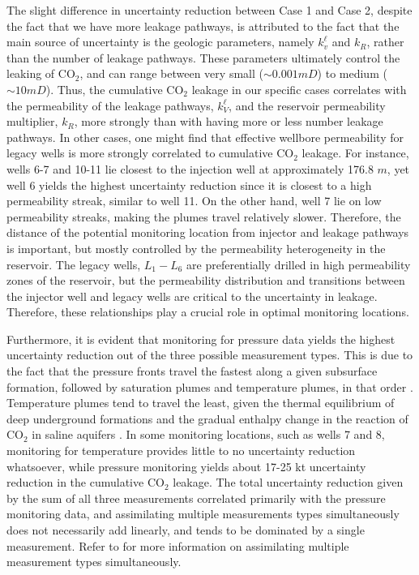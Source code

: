 \documentclass[a4paper,fleqn]{cas-sc}
\begin{document}
The slight difference in uncertainty reduction between Case 1 and Case 2, despite the fact that we have more leakage pathways, is attributed to the fact that the main source of uncertainty is the geologic parameters, namely $k_v^\ell$ and $k_R$, rather than the number of leakage pathways. These parameters ultimately control the leaking of CO$_2$, and can range between very small ($\sim 0.001 mD$) to medium ($\sim 10 mD$). Thus, the cumulative CO$_2$ leakage in our specific cases correlates with the permeability of the leakage pathways, $k_V^\ell$, and the reservoir permeability multiplier, $k_R$, more strongly than with having more or less number leakage pathways. In other cases, one might find that effective wellbore permeability for legacy wells is more strongly correlated to cumulative CO$_2$ leakage. For instance, wells 6-7 and 10-11 lie closest to the injection well at approximately 176.8 $m$, yet well 6 yields the highest uncertainty reduction since it is closest to a high permeability streak, similar to well 11. On the other hand, well 7 lie on low permeability streaks, making the plumes travel relatively slower. Therefore, the distance of the potential monitoring location from injector and leakage pathways is important, but mostly controlled by the permeability heterogeneity in the reservoir. The legacy wells, $L_1-L_6$ are preferentially drilled in high permeability zones of the reservoir, but the permeability distribution and transitions between the injector well and legacy wells are critical to the uncertainty in leakage. Therefore, these relationships play a crucial role in optimal monitoring locations.

Furthermore, it is evident that monitoring for pressure data yields the highest uncertainty reduction out of the three possible measurement types. This is due to the fact that the pressure fronts travel the fastest along a given subsurface formation, followed by saturation plumes and temperature plumes, in that order \citep{Chadwick2006303}. Temperature plumes tend to travel the least, given the thermal equilibrium of deep underground formations and the gradual enthalpy change in the reaction of CO$_2$ in saline aquifers \citep{koschel2006enthalpy}. In some monitoring locations, such as wells 7 and 8, monitoring for temperature provides little to no uncertainty reduction whatsoever, while pressure monitoring yields about 17-25 kt uncertainty reduction in the cumulative CO$_2$ leakage. The total uncertainty reduction given by the sum of all three measurements correlated primarily with the pressure monitoring data, and assimilating multiple measurements types simultaneously does not necessarily add linearly, and tends to be dominated by a single measurement. Refer to \citet{Chen2018} for more information on assimilating multiple measurement types simultaneously.
\end{document}
